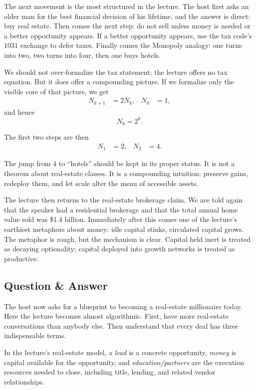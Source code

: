 The next movement is the most structured in the lecture. The host first asks an older man for the best financial decision of his lifetime, and the answer is direct: buy real estate. Then comes the next step: do not sell unless money is needed or a better opportunity appears. If a better opportunity appears, use the tax code's \(1031\) exchange to defer taxes. Finally comes the Monopoly analogy: one turns into two, two turns into four, then one buys hotels.

We should not over-formalize the tax statement; the lecture offers no tax equation. But it does offer a compounding picture. If we formalize only the visible core of that picture, we get
\begin{align}
N_{k+1} &= 2N_k, &
N_0 &= 1,
\end{align}
and hence
\begin{equation}
N_k = 2^k.
\end{equation}

The first two steps are then
\begin{align}
N_1 &= 2, &
N_2 &= 4.
\end{align}

The jump from \(4\) to ``hotels'' should be kept in its proper status. It is not a theorem about real-estate classes. It is a compounding intuition: preserve gains, redeploy them, and let scale alter the menu of accessible assets.

The lecture then returns to the real-estate brokerage claim. We are told again that the speaker had a residential brokerage and that the total annual home value sold was \$1.4 billion. Immediately after this comes one of the lecture's earthiest metaphors about money: idle capital stinks, circulated capital grows. The metaphor is rough, but the mechanism is clear. Capital held inert is treated as decaying optionality; capital deployed into growth networks is treated as productive.

\subsection{Question \& Answer}

The host now asks for a blueprint to becoming a real-estate millionaire today. Here the lecture becomes almost algorithmic. First, have more real-estate conversations than anybody else. Then understand that every deal has three indispensable terms.

\begin{definition}
In the lecture's real-estate model, a \emph{lead} is a concrete opportunity, \emph{money} is capital available for the opportunity, and \emph{education/partners} are the execution resources needed to close, including title, lending, and related vendor relationships.
\end{definition}

